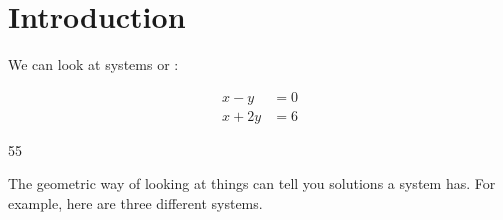 \section{Introduction}

We can look at systems
 or :

\noindent
\begin{minipage}{0.45\textwidth}
    \begin{center}
        \large
        \begin{align*}
            x - y &= 0 \\
            x + 2y &= 6 
        \end{align*}
    \end{center}
\end{minipage}
%
\hfil 
%
\begin{minipage}{0.45\textwidth}
    \begin{center}
        \begin{myTikzpictureGrid}{0.25} {5}{5}
            \end{myTikzpictureGrid}
    \end{center}
\end{minipage}

\noindent 
The geometric way of looking at things can tell you   solutions 
a system has. 
For example, here are three different systems.

\vfil

